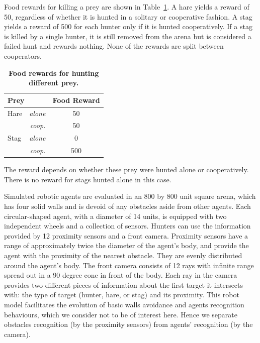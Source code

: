       Food rewards for killing a prey are shown in Table~\ref{table:tableRewardsInitial}. A hare yields a reward of 50, regardless of whether it is hunted in a solitary or cooperative fashion. A stag yields a reward of 500 for each hunter only if it is hunted cooperatively. If a stag is killed by a single hunter, it is still removed from the arena but is considered a failed hunt and rewards nothing. None of the rewards are split between cooperators.

      \begin{table}[ht]
        \centering
          \caption{\textbf{Food rewards for hunting different prey.}}
          \begin{tabular}{|l|r|c|}
            \hline
            \multicolumn{2}{|l|}{\textbf{Prey}} & \textbf{Food Reward} \\
            \hline
            Hare & \textit{alone} & 50 \\
            \hline
            & \textit{coop.} & 50 \\
            \hline
            Stag & \textit{alone} & 0 \\
            \hline
            & \textit{coop.} & 500 \\
            \hline
          \end{tabular}
          \begin{flushleft} The reward depends on whether these prey were hunted alone or cooperatively. There is no reward for stags hunted alone in this case.
          \end{flushleft}
        \label{table:tableRewardsInitial}
      \end{table}

      Simulated robotic agents are evaluated in an 800 by 800 unit square arena, which has four solid walls and is devoid of any obstacles aside from other agents. Each circular-shaped agent, with a diameter of 14 units, is equipped with two independent wheels and a collection of sensors. Hunters can use the information provided by 12 proximity sensors and a front camera. Proximity sensors have a range of approximately twice the diameter of the agent's body, and provide the agent with the proximity of the nearest obstacle. They are evenly distributed around the agent's body. The front camera consists of 12 rays with infinite range spread out in a 90 degree cone in front of the body. Each ray in the camera provides two different pieces of information about the first target it intersects with: the type of target (hunter, hare, or stag) and its proximity. This robot model facilitates the evolution of basic walls avoidance and agents recognition behaviours, which we consider not to be of interest here. Hence we separate obstacles recognition (by the proximity sensors) from agents' recognition (by the camera).

